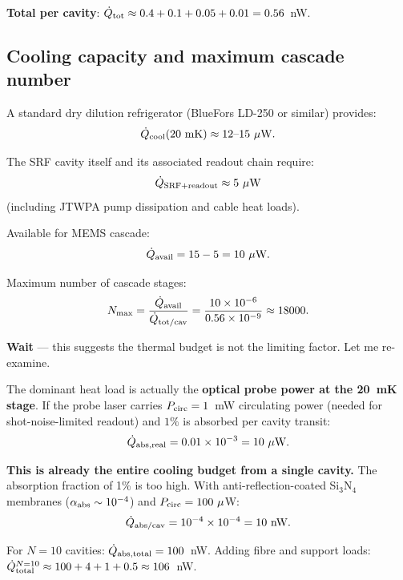\documentclass[11pt]{article}
\newcommand{\ee}[1]{\times 10^{#1}}
\theoremstyle{definition}
\theoremstyle{remark}
\begin{document}
\textbf{Total per cavity}: $\dot{Q}_{\rm tot} \approx 0.4 + 0.1 + 0.05
+ 0.01 = 0.56$~nW.

\subsection{Cooling capacity and maximum cascade number}

A standard dry dilution refrigerator (BlueFors LD-250 or similar)
provides:
\begin{equation}
\dot{Q}_{\rm cool}(20~\text{mK}) \approx 12\text{--}15~\mu\text{W}.
\end{equation}

The SRF cavity itself and its associated readout chain require:
\begin{equation}
\dot{Q}_{\rm SRF+readout} \approx 5~\mu\text{W}
\end{equation}
(including JTWPA pump dissipation and cable heat loads).

Available for MEMS cascade:
\begin{equation}
\dot{Q}_{\rm avail} = 15 - 5 = 10~\mu\text{W}.
\end{equation}

Maximum number of cascade stages:
\begin{equation}
N_{\rm max} = \frac{\dot{Q}_{\rm avail}}{\dot{Q}_{\rm tot/cav}}
= \frac{10\ee{-6}}{0.56\ee{-9}} \approx 18000.
\end{equation}

\textbf{Wait} --- this suggests the thermal budget is not the
limiting factor. Let me re-examine.

The dominant heat load is actually the \textbf{optical probe power
at the 20~mK stage}. If the probe laser carries $P_{\rm circ} = 1$~mW
circulating power (needed for shot-noise-limited readout) and
$1\%$ is absorbed per cavity transit:
\begin{equation}
\dot{Q}_{\rm abs,real} = 0.01 \times 10^{-3} = 10~\mu\text{W}.
\end{equation}

\textbf{This is already the entire cooling budget from a single cavity.}
The absorption fraction of 1\% is too high. With anti-reflection-coated
Si$_3$N$_4$ membranes ($\alpha_{\rm abs} \sim 10^{-4}$) and $P_{\rm circ}
= 100~\mu$W:
\begin{equation}
\dot{Q}_{\rm abs/cav} = 10^{-4}\times 10^{-4} = 10~\text{nW}.
\end{equation}

For $N = 10$ cavities: $\dot{Q}_{\rm abs,total} = 100$~nW.
Adding fibre and support loads: $\dot{Q}_{\rm total}^{N=10}
\approx 100 + 4 + 1 + 0.5 \approx 106$~nW.
\end{document}
